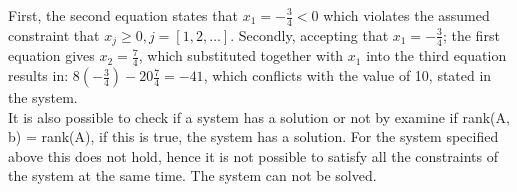 \documentclass{article}
\begin{document}
    First, the second equation states that $x_1 = -\frac{3}{4} < 0$ which violates the assumed
    constraint that $x_j \geq 0 , j=[1,2,\dots]$. Secondly, accepting that $x_1 =
    -\frac{3}{4}$; the first equation gives $x_2 = \frac{7}{4}$, which
    substituted together with $x_1$ into the third equation results in:
    $8(-\frac{3}{4}) - 20\frac{7}{4} = -41$, which conflicts with the value of
    10, stated in the system. \\

    \noindent
    It is also possible to check if a system has a solution or not by examine
    if rank(A, b) = rank(A), if this is true, the system has a solution. For
    the system specified above this does not hold, hence it is not possible to
    satisfy all the constraints of the system at the same time. The system can
    not be solved.
\end{document}
